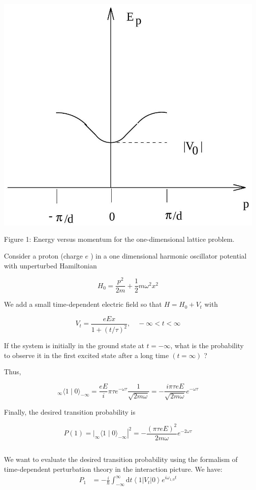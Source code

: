 \documentclass[12pt]{article}
\begin{document}
\begin{center}
\includegraphics[max width=\textwidth]{2024_01_29_bd91e6d395035e9decbag-3}
\end{center}

Figure 1: Energy versus momentum for the one-dimensional lattice problem.

Consider a proton (charge $e$ ) in a one dimensional harmonic oscillator potential with unperturbed Hamiltonian

$$
H_{0}=\frac{p^{2}}{2 m}+\frac{1}{2} m \omega^{2} x^{2}
$$

We add a small time-dependent electric field so that $H=H_{0}+V_{t}$ with

$$
V_{t}=\frac{e E x}{1+(t / \tau)^{2}}, \quad-\infty<t<\infty
$$

If the system is initially in the ground state at $t=-\infty$, what is the probability to observe it in the first excited state after a long time $(t=\infty)$ ?

Thus,

$$
{ }_{\infty}\langle 1 \mid 0\rangle_{-\infty}=\frac{e E}{i} \pi \tau e^{-\omega \tau} \frac{1}{\sqrt{2 m \omega}}=-\frac{i \pi \tau e E}{\sqrt{2 m \omega}} e^{-\omega \tau}
$$

Finally, the desired transition probability is

$$
P(1)=\left.\left.\right|_{\infty}\langle 1 \mid 0\rangle_{-\infty}\right|^{2}=-\frac{(\pi \tau e E)^{2}}{2 m \omega} e^{-2 \omega \tau}
$$
\subsection{}
We want to evaluate the desired transition probability using the formalism of time-dependent perturbation theory in the interaction picture. We have:
\begin{equation}
  \begin{aligned}
    P_{1} &= -\frac{i}{\hbar} \int_{-\infty}^{\infty} \mathrm{d} t\left\langle 1\left|V_{t}\right| 0\right\rangle e^{i \omega_{1, 0} t} \\
\end{aligned}
\end{equation}
\end{document}
